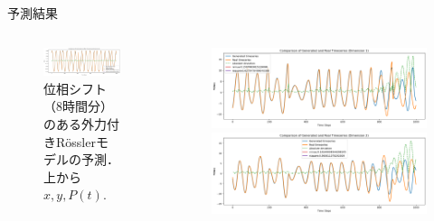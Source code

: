 \begin{frame}{予測結果}
\begin{columns}[T]
\begin{column}{.5\textwidth}
\begin{figure}
        \vspace{.5em}
        \begin{minipage}[c][.27\textheight][c]{\linewidth}
          \centering
          \includegraphics[width=0.7\linewidth]{Fig/8.p.png}
          \caption{\scriptsize{位相シフト（8時間分）のある外力付きRösslerモデルの予測．上から $x, y, P(t)$. }}
        \end{minipage}
      \end{figure}
    \end{column}
    \begin{column}{.5\textwidth}
      \begin{figure}
        \vspace{-.5cm}
        \begin{minipage}[c][.27\textheight][c]{\linewidth}
          \centering
          \includegraphics[width=0.7\linewidth]{Fig/10.x.png}
        \end{minipage}
    
        \vspace{-.5em}

        \begin{minipage}[c][.27\textheight][c]{\linewidth}
          \centering
          \includegraphics[width=0.7\linewidth]{Fig/10.y.png}
        \end{minipage}
        

\end{figure}
\end{column}
\end{columns}
\end{frame}
